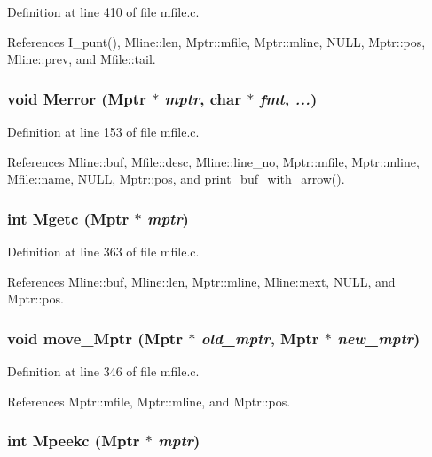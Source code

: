Definition at line 410 of file mfile.c.

References I\_\-punt(), Mline::len, Mptr::mfile, Mptr::mline, NULL, Mptr::pos, Mline::prev, and Mfile::tail.
\subsubsection{\setlength{\rightskip}{0pt plus 5cm}void Merror (\bf{Mptr} $\ast$ {\em mptr}, char $\ast$ {\em fmt},  {\em ...})}\label{mfile_8h_a088b3c38141dc63cd443ac3a5ffc324}




Definition at line 153 of file mfile.c.

References Mline::buf, Mfile::desc, Mline::line\_\-no, Mptr::mfile, Mptr::mline, Mfile::name, NULL, Mptr::pos, and print\_\-buf\_\-with\_\-arrow().
\subsubsection{\setlength{\rightskip}{0pt plus 5cm}int Mgetc (\bf{Mptr} $\ast$ {\em mptr})}\label{mfile_8h_c4664739cce4f26f42fdd71d8cc13119}




Definition at line 363 of file mfile.c.

References Mline::buf, Mline::len, Mptr::mline, Mline::next, NULL, and Mptr::pos.
\subsubsection{\setlength{\rightskip}{0pt plus 5cm}void move\_\-Mptr (\bf{Mptr} $\ast$ {\em old\_\-mptr}, \bf{Mptr} $\ast$ {\em new\_\-mptr})}\label{mfile_8h_081956979b1e3c7cf53099a1c0817e08}




Definition at line 346 of file mfile.c.

References Mptr::mfile, Mptr::mline, and Mptr::pos.
\subsubsection{\setlength{\rightskip}{0pt plus 5cm}int Mpeekc (\bf{Mptr} $\ast$ {\em mptr})}\label{mfile_8h_74cd5a01b920e491f3ce448ad36f0f24}




